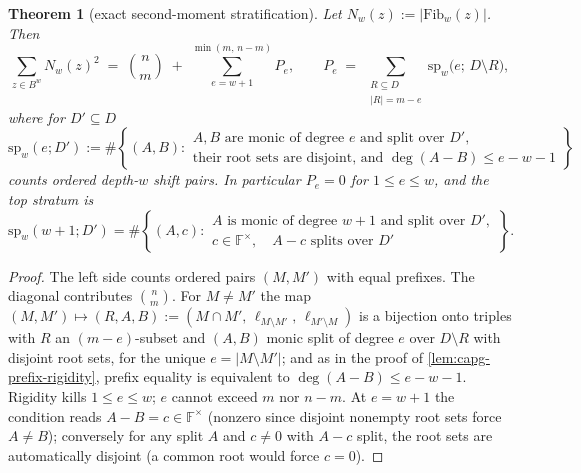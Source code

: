 \documentclass[11pt]{article}
\newtheorem{theorem}{Theorem}[section]
\theoremstyle{definition}
\theoremstyle{remark}
\newcommand{\F}{\mathbb{F}}
\begin{document}
\begin{theorem}[exact second-moment stratification]\label{thm:capg-second-moment}
Let $N_w(z):=|\mathrm{Fib}_w(z)|$.  Then
\[
\sum_{z\in B^{w}} N_w(z)^{2}
\;=\;\binom{n}{m}\;+\;\sum_{e=w+1}^{\min(m,\,n-m)} P_e ,
\qquad
P_e\;=\;\sum_{\substack{R\subseteq D\\ |R|=m-e}}
\mathrm{sp}_w\big(e;\,D\setminus R\big),
\]
where for $D'\subseteq D$
\[
\mathrm{sp}_w(e;D')
:=\#\left\{(A,B):
\begin{array}{l}
A,B\text{ are monic of degree }e\text{ and split over }D',\\
\text{their root sets are disjoint, and }\deg(A-B)\le e-w-1
\end{array}
\right\}
\]
counts ordered \emph{depth-$w$ shift pairs}.  In particular $P_e=0$ for
$1\leq e\leq w$, and the top stratum is
\[
\mathrm{sp}_w(w+1;D')
=\#\left\{(A,c):
\begin{array}{l}
A\text{ is monic of degree }w+1\text{ and split over }D',\\
c\in\F^\times,\quad A-c\text{ splits over }D'
\end{array}
\right\}.
\]
\end{theorem}

\begin{proof}
The left side counts ordered pairs $(M,M')$ with equal prefixes.  The
diagonal contributes $\binom{n}{m}$.  For $M\neq M'$ the map
$(M,M')\mapsto (R,A,B):=(M\cap M',\,\ell_{M\setminus M'},\,
\ell_{M'\setminus M})$ is a bijection onto triples with $R$ an
$(m-e)$-subset and $(A,B)$ monic split of degree $e$ over $D\setminus R$
with disjoint root sets, for the unique $e=|M\setminus M'|$; and as in the
proof of \cref{lem:capg-prefix-rigidity}, prefix equality is equivalent to
$\deg(A-B)\leq e-w-1$.  Rigidity kills $1\leq e\leq w$; $e$ cannot exceed
$m$ nor $n-m$.  At $e=w+1$ the condition reads $A-B=c\in\F^{\times}$
(nonzero since disjoint nonempty root sets force $A\neq B$); conversely for
any split $A$ and $c\neq 0$ with $A-c$ split, the root sets are
automatically disjoint (a common root would force $c=0$).
\end{proof}
\end{document}
